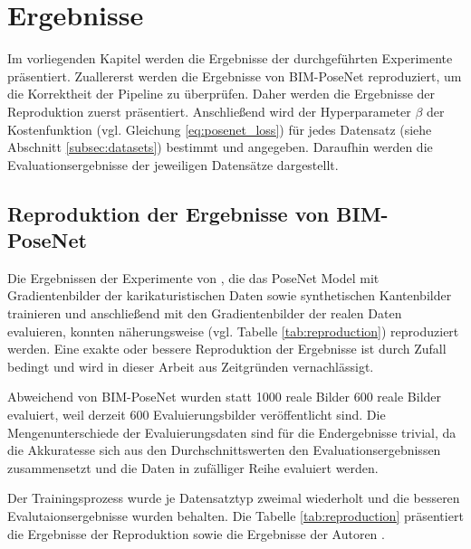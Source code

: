 
\section{Ergebnisse}
Im vorliegenden Kapitel werden die Ergebnisse der durchgeführten Experimente präsentiert. Zuallererst werden die Ergebnisse von BIM-PoseNet \cite{acharyaBIMPoseNetIndoorCamera2019} reproduziert, um die Korrektheit der Pipeline zu überprüfen. Daher werden die Ergebnisse der Reproduktion zuerst präsentiert. Anschließend wird der Hyperparameter $\beta$ der Kostenfunktion (vgl. Gleichung \ref{eq:posenet_loss}) für jedes Datensatz (siehe Abschnitt \ref{subsec:datasets}) bestimmt und angegeben. Daraufhin werden die Evaluationsergebnisse der jeweiligen Datensätze dargestellt.
\subsection{Reproduktion der Ergebnisse von BIM-PoseNet}
Die Ergebnissen der Experimente von \citet{acharyaBIMPoseNetIndoorCamera2019}, die das PoseNet Model mit Gradientenbilder der karikaturistischen Daten sowie synthetischen Kantenbilder trainieren und anschließend mit den Gradientenbilder der realen Daten evaluieren, konnten näherungsweise (vgl. Tabelle \ref{tab:reproduction}) reproduziert werden. Eine exakte oder bessere Reproduktion der Ergebnisse ist durch Zufall bedingt und wird in dieser Arbeit aus Zeitgründen vernachlässigt.

Abweichend von BIM-PoseNet wurden statt 1000 reale Bilder 600 reale Bilder evaluiert, weil derzeit 600 Evaluierungsbilder veröffentlicht sind. Die Mengenunterschiede der Evaluierungsdaten sind für die Endergebnisse trivial, da die Akkuratesse sich aus den Durchschnittswerten den Evaluationsergebnissen zusammensetzt und die Daten in zufälliger Reihe evaluiert werden. 

Der Trainingsprozess wurde je Datensatztyp zweimal wiederholt und die besseren Evalutaionsergebnisse wurden behalten. Die Tabelle \ref{tab:reproduction} präsentiert die Ergebnisse der Reproduktion sowie die Ergebnisse der Autoren \citet{acharyaBIMPoseNetIndoorCamera2019}.


